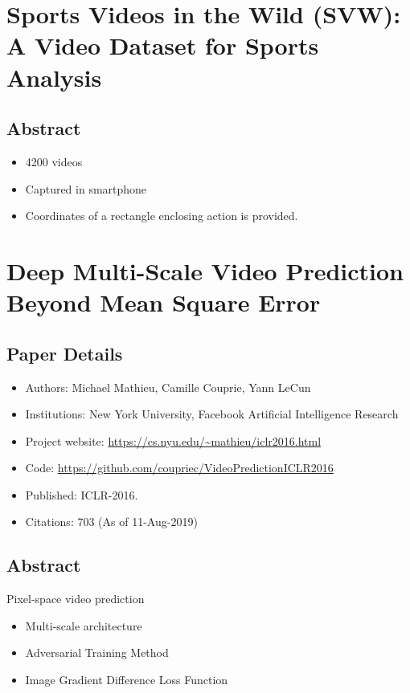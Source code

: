 \documentclass{article}
\begin{document}
    \section{Sports Videos in the Wild (SVW): A Video Dataset for Sports Analysis}\label{sec:Sports_Videos_in_the_Wild_(SVW)_A_Video_Dataset_for_Sports_Analysis}
    \subsection*{Abstract}
    \begin{itemize}
        \item 4200 videos
        \item Captured in smartphone
        \item Coordinates of a rectangle enclosing action is provided.
    \end{itemize}
    \newpage


    \section{Deep Multi-Scale Video Prediction Beyond Mean Square Error}\label{sec:Deep_Multi_Scale_Video_Prediction_Beyond_Mean_Square_Error}
    \subsection*{Paper Details}
    \begin{itemize}
        \item Authors: Michael Mathieu, Camille Couprie, Yann LeCun
        \item Institutions: New York University, Facebook Artificial Intelligence Research
        \item Project website: \url{https://cs.nyu.edu/~mathieu/iclr2016.html}
        \item Code: \url{https://github.com/coupriec/VideoPredictionICLR2016}
        \item Published: ICLR-2016.
        \item Citations: 703 (As of 11-Aug-2019)
    \end{itemize}

    \subsection*{Abstract}
    Pixel-space video prediction
    \begin{itemize}
        \item Multi-scale architecture
        \item Adversarial Training Method
        \item Image Gradient Difference Loss Function
    \end{itemize}
\end{document}
